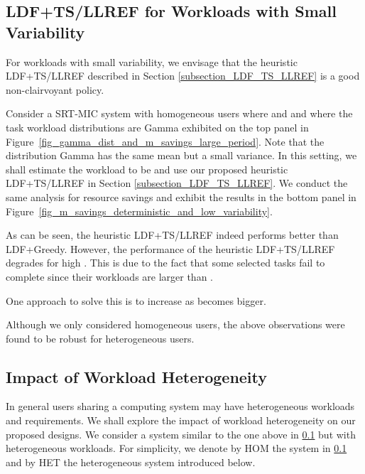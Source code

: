 \documentclass[prodmode,acmtompecs]{acmsmall}
\newcommand{\myComments}[1]{}
\newif\ifdissertation
\newcommand{\dissertationStart}{\ifdissertation  \myComments{Dissertation version: }}
\newcommand{\commentEnd}{\myComments{End}}
\begin{document}
\subsection{LDF+TS/LLREF for Workloads with Small Variability}
\label{subsubsection_heuristic_TS_LLREF_small_var}
For workloads with small variability, we envisage that the heuristic LDF+TS/LLREF described in Section \ref{subsection_LDF_TS_LLREF} is a good non-clairvoyant policy. 
\dissertationStart
For non-deterministic workloads, the LDF+TS/LLREF policy requires knowledge of workload realizations and so is not non-clairvoyant. 
However, we envisage that the heuristic estimation based LDF+TS/LLREF described in \ref{subsection_LDF_TS_LLREF} can be a good non-clairvoyant generalization, especially for random NBUE workloads with small variability. 
\commentEnd\fi
Consider a SRT-MIC system with homogeneous users where  and  and where the task workload distributions are Gamma exhibited on the top panel in Figure~{\ref{fig_gamma_dist_and_m_savings_large_period}}. 
Note that the distribution Gamma has the same mean  but a small variance. In this setting, we shall estimate the workload to be  and use our proposed heuristic LDF+TS/LLREF in Section \ref{subsection_LDF_TS_LLREF}. 
We conduct the same analysis for resource savings and exhibit the results in the bottom panel in Figure~{\ref{fig_m_savings_deterministic_and_low_variability}}. 

As can be seen, the heuristic LDF+TS/LLREF indeed performs better than LDF+Greedy. However, the performance of the heuristic LDF+TS/LLREF degrades for high . This is due to the fact that some selected tasks fail to complete since their workloads are larger than . 
\dissertationStart
and that becomes a more critical problem as  becomes bigger. 
\commentEnd\fi
One approach to solve this is to increase  as  becomes bigger. 
\dissertationStart
and we observe it can improve the resource savings for the heuristic LDF+TS/LLREF in large  regime. 
\commentEnd\fi



Although we only considered homogeneous users, the above observations were found to be robust for heterogeneous users. 

\dissertationStart
\subsection{Impact of Workload Heterogeneity}
In general users sharing a computing system may have heterogeneous workloads and requirements. We shall explore the impact of workload heterogeneity on our proposed designs. We consider a system similar to the one above in \ref{subsubsection_heuristic_TS_LLREF_small_var} but with heterogeneous workloads. For simplicity, we denote by HOM the system in \ref{subsubsection_heuristic_TS_LLREF_small_var} and by HET the heterogeneous system introduced below. 
\end{document}
